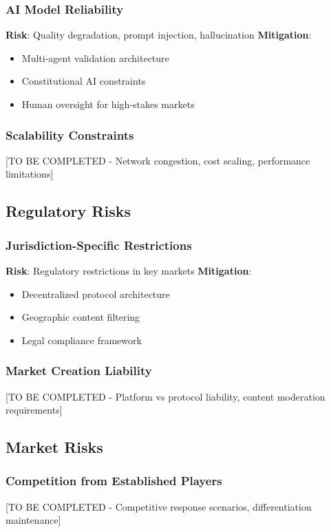 \documentclass[11pt,a4paper]{article}
\begin{document}
\subsubsection{AI Model Reliability}
\textbf{Risk}: Quality degradation, prompt injection, hallucination
\textbf{Mitigation}:
\begin{itemize}
    \item Multi-agent validation architecture
    \item Constitutional AI constraints
    \item Human oversight for high-stakes markets
\end{itemize}

\subsubsection{Scalability Constraints}
[TO BE COMPLETED - Network congestion, cost scaling, performance limitations]

\subsection{Regulatory Risks}

\subsubsection{Jurisdiction-Specific Restrictions}
\textbf{Risk}: Regulatory restrictions in key markets
\textbf{Mitigation}:
\begin{itemize}
    \item Decentralized protocol architecture
    \item Geographic content filtering
    \item Legal compliance framework
\end{itemize}

\subsubsection{Market Creation Liability}
[TO BE COMPLETED - Platform vs protocol liability, content moderation requirements]

\subsection{Market Risks}

\subsubsection{Competition from Established Players}
[TO BE COMPLETED - Competitive response scenarios, differentiation maintenance]
\end{document}
